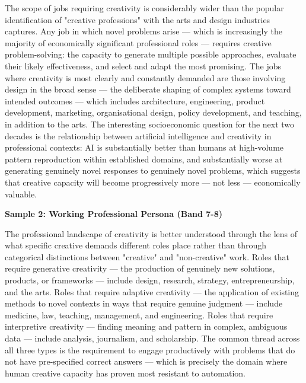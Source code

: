 The scope of jobs requiring creativity is considerably wider than the popular identification of "creative professions" with the arts and design industries captures. Any job in which novel problems arise — which is increasingly the majority of economically significant professional roles — requires creative problem-solving: the capacity to generate multiple possible approaches, evaluate their likely effectiveness, and select and adapt the most promising. The jobs where creativity is most clearly and constantly demanded are those involving design in the broad sense — the deliberate shaping of complex systems toward intended outcomes — which includes architecture, engineering, product development, marketing, organisational design, policy development, and teaching, in addition to the arts. The interesting socioeconomic question for the next two decades is the relationship between artificial intelligence and creativity in professional contexts: AI is substantially better than humans at high-volume pattern reproduction within established domains, and substantially worse at generating genuinely novel responses to genuinely novel problems, which suggests that creative capacity will become progressively more — not less — economically valuable.

\textbf{Sample 2: Working Professional Persona (Band 7-8)}

The professional landscape of creativity is better understood through the lens of what specific creative demands different roles place rather than through categorical distinctions between "creative" and "non-creative" work. Roles that require generative creativity — the production of genuinely new solutions, products, or frameworks — include design, research, strategy, entrepreneurship, and the arts. Roles that require adaptive creativity — the application of existing methods to novel contexts in ways that require genuine judgment — include medicine, law, teaching, management, and engineering. Roles that require interpretive creativity — finding meaning and pattern in complex, ambiguous data — include analysis, journalism, and scholarship. The common thread across all three types is the requirement to engage productively with problems that do not have pre-specified correct answers — which is precisely the domain where human creative capacity has proven most resistant to automation.

\separator


